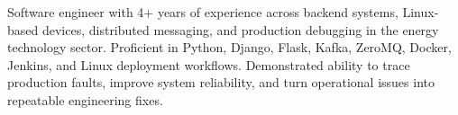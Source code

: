 

\begin{cvparagraph}

Software engineer with 4+ years of experience across backend systems, Linux-based devices, distributed messaging, and production debugging in the energy technology sector. Proficient in Python, Django, Flask, Kafka, ZeroMQ, Docker, Jenkins, and Linux deployment workflows. Demonstrated ability to trace production faults, improve system reliability, and turn operational issues into repeatable engineering fixes.
\end{cvparagraph}
